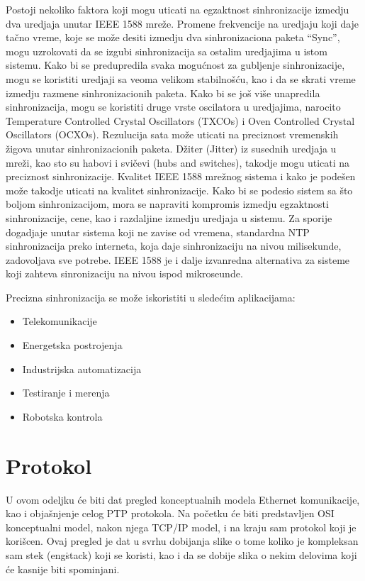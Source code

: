 \documentclass[a4paper,12pt, master]{etf}
\begin{document}
	Postoji nekoliko faktora koji mogu uticati na egzaktnost sinhronizacije
	izmedju dva	uredjaja unutar IEEE 1588 mre\v{z}e. Promene frekvencije na
	uredjaju koji daje ta\v{c}no vreme,	koje se mo\v{z}e desiti izmedju dva
	sinhronizaciona paketa ``Sync'', mogu uzrokovati da se izgubi
	sinhronizacija sa ostalim uredjajima u istom sistemu. Kako bi se
	predupredila svaka mogu\'{c}nost za gubljenje sinhronizacije, mogu se
	koristiti uredjaji sa veoma velikom	stabilno\v{s}\'{c}u, kao i da se skrati
	vreme izmedju razmene sinhronizacionih paketa. Kako bi se jo\v{s} vi\v{s}e
	unapredila sinhronizacija, mogu se koristiti druge vrste oscilatora u
	uredjajima, narocito Temperature Controlled Crystal Oscillators (TXCOs) i
	Oven Controlled Crystal	Oscillators (OCXOs). Rezulucija sata mo\v{z}e
	uticati na preciznost vremenskih \v{z}igova unutar sinhronizacionih paketa.
	D\v{z}iter (Jitter) iz susednih uredjaja u mre\v{z}i, kao sto su habovi i
	svi\v{c}evi (hubs and switches), takodje mogu uticati na preciznost
	sinhronizacije. Kvalitet IEEE 1588 mre\v{z}nog sistema i kako je
	pode\v{s}en mo\v{z}e takodje uticati na kvalitet sinhronizacije. Kako bi
	se podesio sistem sa \v{s}to boljom sinhronizacijom, mora se napraviti
	kompromis izmedju egzaktnosti sinhronizacije, cene, kao i razdaljine
	izmedju uredjaja u sistemu. Za sporije dogadjaje unutar sistema koji ne
	zavise od vremena, standardna NTP sinhronizacija preko interneta, koja daje
	sinhronizaciju na nivou milisekunde, zadovoljava sve potrebe. IEEE 1588 je
	i dalje izvanredna alternativa za sisteme koji zahteva sinronizaciju na
	nivou ispod	mikroseunde.

	Precizna sinhronizacija se mo\v{z}e iskoristiti u slede\'{c}im aplikacijama:
	\begin{itemize}
		\item Telekomunikacije
		\item Energetska postrojenja
		\item Industrijska automatizacija
		\item Testiranje i merenja
		\item Robotska kontrola
	\end{itemize}

	\newpage

	\chapter{Protokol}

	U ovom odeljku \'{c}e biti dat pregled konceptualnih modela Ethernet
	komunikacije, kao i obja\v{s}njenje	celog PTP protokola. Na po\v{c}etku
	\'{c}e biti predstavljen OSI konceptualni model, nakon njega TCP/IP	model,
	i na kraju sam protokol koji je kori\v{s}cen. Ovaj pregled je dat u svrhu
	dobijanja slike o tome koliko je kompleksan sam stek (eng\. stack) koji se
    koristi, kao i da se dobije slika o nekim delovima koji \'{c}e kasnije biti
    spominjani.
\end{document}
